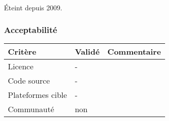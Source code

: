 Éteint depuis 2009.

\subsubsection{Acceptabilité}
\begin{tabular}{lll}
\toprule
	Critère				&	Validé		&	Commentaire	\\
\midrule
	Licence				&	-			&		\\
	Code source			&	-			&		\\
	Plateformes cible	&	-			&		\\
	Communauté			&	non			&		\\
\bottomrule
\end{tabular}

